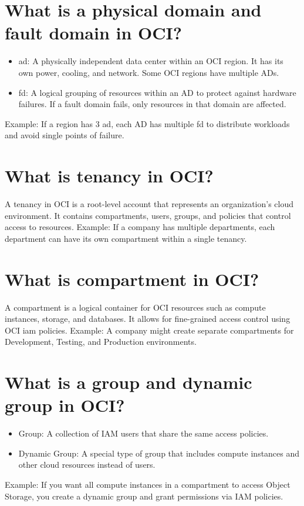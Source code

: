 \documentclass[../main.tex]{subfiles}
\begin{document}
\section{What is a physical domain and fault domain in OCI?}
\begin{itemize}
  \item {\acrfull{ad}: A physically independent data center within an OCI region. 
    It has its own power, cooling, and network. Some OCI regions have multiple ADs.}
  \item {\acrfull{fd}: A logical grouping of resources within an AD to protect against hardware failures.
    If a fault domain fails, only resources in that domain are affected.}
\end{itemize}
Example: If a region has 3 \acrlong{ad}, each AD has multiple \acrlong{fd} to distribute workloads and avoid single points of failure.

\section{What is tenancy in OCI?}
A tenancy in OCI is a root-level account that represents an organization’s cloud environment.
It contains compartments, users, groups, and policies that control access to resources.
Example: If a company has multiple departments, each department can have its own compartment within a single tenancy.

\section{What is compartment in OCI?}
A compartment is a logical container for OCI resources such as compute instances, storage, and databases.
It allows for fine-grained access control using OCI \acrfull{iam} policies.
Example: A company might create separate compartments for Development, Testing, and Production environments.

\section{What is a group and dynamic group in OCI?}
\begin{itemize}
  \item Group: A collection of IAM users that share the same access policies.
  \item Dynamic Group: A special type of group that includes compute instances and other cloud resources instead of users.
\end{itemize}
Example: If you want all compute instances in a compartment to access Object Storage, you create a dynamic group and grant permissions via IAM policies.
\end{document}
